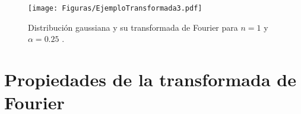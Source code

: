 \begin{ejemplo}







\begin{figure}[H]
    \centering
    \texttt{[image: Figuras/EjemploTransformada3.pdf]}
    \caption{Distribución gaussiana y su transformada de Fourier para $n=1$ y $\alpha =0.25$ .}
    \label{Espectro4}
\end{figure}
\end{ejemplo}


\section{Propiedades de la transformada de Fourier}

